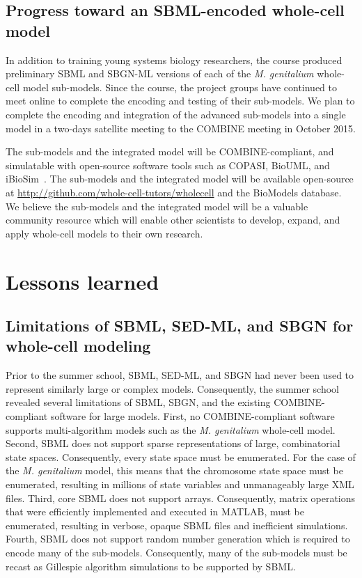 \documentclass[journal,transmag]{IEEEtran}
\begin{document}
\subsection{Progress toward an SBML-encoded whole-cell model}
In addition to training young systems biology researchers, the course produced preliminary SBML and SBGN-ML versions of each of the \textit{M. genitalium} whole-cell model sub-models.
Since the course, the project groups have continued to meet online to complete the encoding and testing of their sub-models.
We plan to complete the encoding and integration of the advanced sub-models into a single model in a two-days satellite meeting to the COMBINE meeting in October 2015. 

The sub-models and the integrated model will be COMBINE-compliant, and simulatable with open-source software tools such as COPASI, BioUML, and iBioSim~\cite{Stevens2013}.
The sub-models and the integrated model will be available open-source at \url{http://github.com/whole-cell-tutors/wholecell} and the BioModels database.
We believe the sub-models and the integrated model will be a valuable community resource which will enable other scientists to develop, expand, and apply whole-cell models to their own research.

\section{Lessons learned}

\subsection{Limitations of SBML, SED-ML, and SBGN for whole-cell modeling}
Prior to the summer school, SBML, SED-ML, and SBGN had never been used to represent similarly large or complex models. 
Consequently, the summer school revealed several limitations of SBML, SBGN, and the existing COMBINE-compliant software for large models.
First, no COMBINE-compliant software supports multi-algorithm models such as the \textit{M. genitalium} whole-cell model. 
Second, SBML does not support sparse representations of large, combinatorial state spaces. Consequently, every state space must be enumerated. For the case of the \textit{M. genitalium} model, this means that the chromosome state space must be enumerated, resulting in millions of state variables and unmanageably large XML files.
Third, core SBML  does not support arrays. Consequently, matrix operations that were efficiently implemented and executed in MATLAB, must be enumerated, resulting in verbose, opaque SBML files and inefficient simulations.
Fourth, SBML does not support random number generation which is required to encode many of the sub-models. Consequently, many of the sub-models must be recast as Gillespie algorithm simulations to be supported by SBML.
\end{document}
